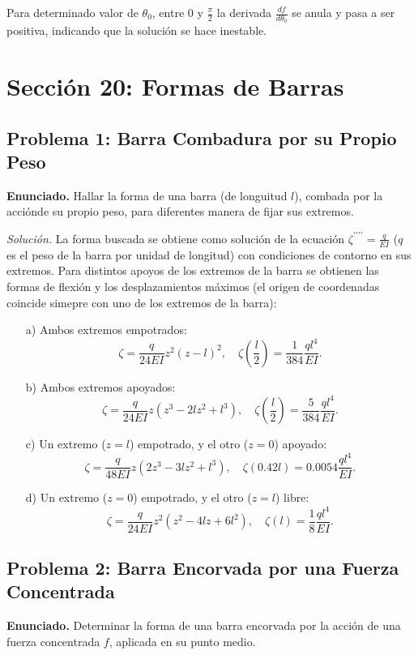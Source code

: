 \documentclass{article}
\begin{document}
Para determinado valor de $\theta_0$, entre $0$ y $\frac{\pi}{2}$ la derivada $\frac{df}{d\theta_0}$ se anula y pasa a ser positiva, indicando que la solución se hace inestable.

\section*{Sección 20: Formas de Barras}

\subsection*{Problema 1: Barra Combadura por su Propio Peso}
\textbf{Enunciado.} Hallar la forma de una barra (de longuitud $l$), combada por la acciónde su propio peso, para diferentes manera de fijar sus extremos.

\textit{Solución.} La forma buscada se obtiene como solución de la ecuación $\zeta^{\prime\prime\prime\prime} = \frac{q}{EI}$ ($q$ es el peso de la barra por unidad de longitud) con condiciones de contorno en sus extremos. Para distintos apoyos de los extremos de la barra se obtienen las formas de flexión y los desplazamientos máximos (el origen de coordenadas coincide simepre con uno de los extremos de la barra):

\begin{enumerate}
    \item[a)] Ambos extremos empotrados:
    $$
    \zeta = \frac{q}{24EI} z^2(z-l)^2, \quad \zeta\left(\frac{l}{2}\right) = \frac{1}{384} \frac{ql^4}{EI}.
    $$

    \item[b)] Ambos extremos apoyados:
    $$
    \zeta = \frac{q}{24EI} z(z^3 - 2lz^2 + l^3), \quad \zeta\left(\frac{l}{2}\right) = \frac{5}{384} \frac{ql^4}{EI}.
    $$

    \item[c)] Un extremo ($z = l$) empotrado, y el otro ($z = 0$) apoyado:
    $$
    \zeta = \frac{q}{48EI} z(2z^3 - 3lz^2 + l^3), \quad \zeta(0.42l) = 0.0054 \frac{ql^4}{EI}.
    $$

    \item[d)] Un extremo ($z = 0$) empotrado, y el otro ($z = l$) libre:
    $$
    \zeta = \frac{q}{24EI} z^2(z^2 - 4lz + 6l^2), \quad \zeta(l) = \frac{1}{8} \frac{ql^4}{EI}.
    $$
\end{enumerate}

\subsection*{Problema 2: Barra Encorvada por una Fuerza Concentrada}
\textbf{Enunciado.} Determinar la forma de una barra encorvada por la acción de una fuerza concentrada $f$, aplicada en su punto medio.
\end{document}
